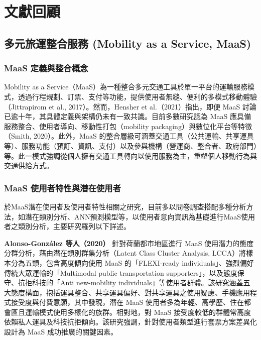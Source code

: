 
\providecommand{\tightlist}{%
  \setlength{\itemsep}{0pt}\setlength{\parskip}{0pt}
}

\chapter{文獻回顧}\label{ux6587ux737bux56deux9867}

\section{多元旅運整合服務 (Mobility as a Service,
MaaS)}\label{ux591aux5143ux65c5ux904bux6574ux5408ux670dux52d9-mobility-as-a-service-maas}

\subsection{MaaS
定義與整合概念}\label{maas-ux5b9aux7fa9ux8207ux6574ux5408ux6982ux5ff5}

Mobility as a
Service（MaaS）為一種整合多元交通工具於單一平台的運輸服務模式，透過行程規劃、訂票、支付等功能，提供使用者無縫、便利的多模式移動體驗（Jittrapirom
et al., 2017）。然而，Hensher et al.（2021）指出，即便 MaaS
討論已逾十年，其具體定義與架構仍未有一致共識。目前多數研究認為 MaaS
應具備服務整合、使用者導向、移動性打包（mobility
packaging）與數位化平台等特徵（Smith, 2020）。此外，MaaS
的整合層級可涵蓋交通工具（公共運輸、共享運具等）、服務功能（預訂、資訊、支付）以及參與機構（營運商、整合者、政府部門）等。此一模式強調從個人擁有交通工具轉向以使用服務為主，重塑個人移動行為與交通供給方式。

\subsection{MaaS
使用者特性與潛在使用者}\label{maas-ux4f7fux7528ux8005ux7279ux6027ux8207ux6f5bux5728ux4f7fux7528ux8005}

於MaaS潛在使用者及使用者特性相關之研究，目前多以問卷調查搭配多種分析方法，如潛在類別分析、ANN預測模型等，以使用者意向資訊為基礎進行MaaS使用者之類別分析，主要研究羅列以下詳述。

\textbf{Alonso-González 等人（2020）} 針對荷蘭都市地區進行 MaaS
使用潛力的態度分群分析，藉由潛在類別群集分析（Latent Class Cluster
Analysis, LCCA）將樣本分為五類，包含高度傾向使用 MaaS 的「FLEXI-ready
individuals」、強烈偏好傳統大眾運輸的「Multimodal public transportation
supporters」，以及態度保守、抗拒科技的「Anti new-mobility
individuals」等使用者群體。該研究涵蓋五大態度構面，抱括運具整合、共享運具偏好、對共享運具之使用疑慮、手機應用程式接受度與付費意願，其中發現，潛在
MaaS
使用者多為年輕、高學歷、住在都會區且運輸模式使用多樣化的族群。相對地，對
MaaS
接受度較低的群體常高度依賴私人運具及科技抗拒傾向。該研究強調，針對使用者類型進行套票方案差異化設計為
MaaS 成功推廣的關鍵因素。

